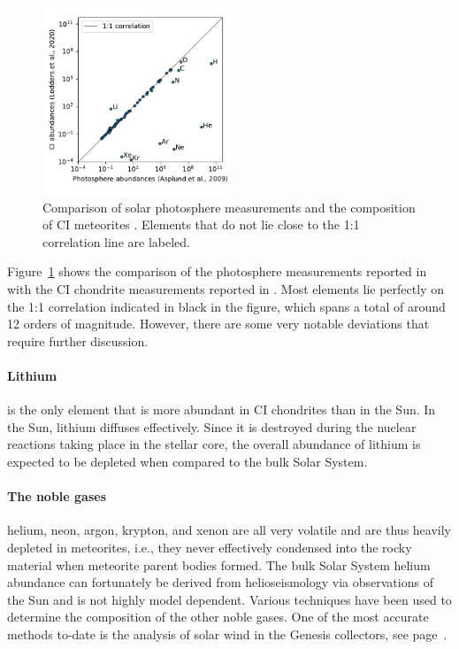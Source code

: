 \begin{figure}[bt] \centering
    \includegraphics[width=0.5\textwidth]{graphics/solar_system_abundances/solar_photosphere_ci_abundances_correlation}
    \caption{Comparison of solar photosphere measurements \citep{asplund09} and the composition of CI meteorites \citep{lodders20}. Elements that do not lie close to the 1:1 correlation line are labeled.}
    \label{fig:solar_photosphere_ci_comparison}
\end{figure}
Figure~\ref{fig:solar_photosphere_ci_comparison} shows the comparison of the photosphere measurements reported in \citet{asplund09} with the CI chondrite measurements reported in \citet{lodders20}. Most elements lie perfectly on the 1:1 correlation indicated in black in the figure, which spans a total of around 12 orders of magnitude. However, there are some very notable deviations that require further discussion.

\paragraph{Lithium} is the only element that is more abundant in CI chondrites than in the Sun. In the Sun, lithium diffuses effectively. Since it is destroyed during the nuclear reactions taking place in the stellar core, the overall abundance of lithium is expected to be depleted when compared to the bulk Solar System.

\paragraph{The noble gases} helium, neon, argon, krypton, and xenon are all very volatile and are thus heavily depleted in meteorites, i.e., they never effectively condensed into the rocky material when meteorite parent bodies formed. The bulk Solar System helium abundance can fortunately be derived from helioseismology via observations of the Sun and is not highly model dependent. Various techniques have been used to determine the composition of the other noble gases. One of the most accurate methods to-date is the analysis of solar wind in the Genesis collectors, see page~\pageref{sec:solar_abus:solar_wind}.

